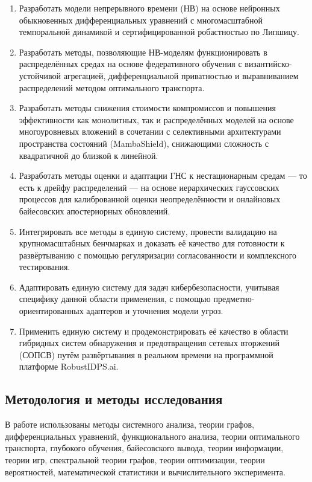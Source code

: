 \documentclass[12pt,a5paper]{article}
\begin{document}
\begin{enumerate}
\item Разработать модели непрерывного времени (НВ) на основе нейронных обыкновенных дифференциальных уравнений с многомасштабной темпоральной динамикой и сертифицированной робастностью по Липшицу.

\item Разработать методы, позволяющие НВ-моделям функционировать в распределённых средах на основе федеративного обучения с византийско-устойчивой агрегацией, дифференциальной приватностью и выравниванием распределений методом оптимального транспорта.

\item Разработать методы снижения стоимости компромиссов и повышения эффективности как монолитных, так и распределённых моделей на основе многоуровневых вложений в сочетании с селективными архитектурами пространства состояний (MambaShield), снижающими сложность с квадратичной до близкой к линейной.

\item Разработать методы оценки и адаптации ГНС к нестационарным средам --- то есть к дрейфу распределений --- на основе иерархических гауссовских процессов для калиброванной оценки неопределённости и онлайновых байесовских апостериорных обновлений.

\item Интегрировать все методы в единую систему, провести валидацию на крупномасштабных бенчмарках и доказать её качество для готовности к развёртыванию с помощью регуляризации согласованности и комплексного тестирования.

\item Адаптировать единую систему для задач кибербезопасности, учитывая специфику данной области применения, с помощью предметно-ориентированных адаптеров и уточнения модели угроз.

\item Применить единую систему и продемонстрировать её качество в области гибридных систем обнаружения и предотвращения сетевых вторжений (СОПСВ) путём развёртывания в реальном времени на программной платформе RobustIDPS.ai.
\end{enumerate}

\subsection*{Методология и методы исследования}

В работе использованы методы системного анализа, теории графов, дифференциальных уравнений, функционального анализа, теории оптимального транспорта, глубокого обучения, байесовского вывода, теории информации, теории игр, спектральной теории графов, теории оптимизации, теории вероятностей, математической статистики и вычислительного эксперимента.
\end{document}
